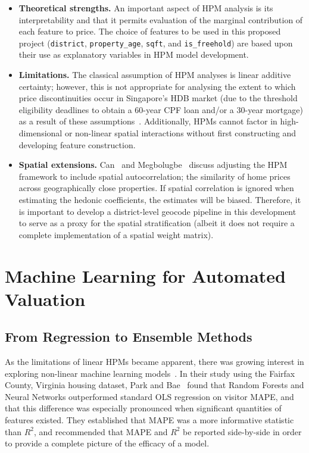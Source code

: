 \begin{itemize}
    \item \textbf{Theoretical strengths.} An important aspect of HPM analysis is its interpretability and that it permits 
    evaluation of the marginal contribution of each feature to price. The choice 
    of features to be used in this proposed project (\texttt{district}, 
    \texttt{property\_age}, \texttt{sqft}, and \texttt{is\_freehold}) are based 
    upon their use as explanatory variables in HPM model development.

    \item \textbf{Limitations.} The classical assumption of HPM analyses is linear additive certainty; however, 
    this is not appropriate for analysing the extent to which price 
    discontinuities occur in Singapore's HDB market (due to the threshold 
    eligibility deadlines to obtain a $60$-year CPF loan and/or a $30$-year 
    mortgage) as a result of these assumptions~\cite{fan2006determinants}. 
    Additionally, HPMs cannot factor in high-dimensional or non-linear spatial 
    interactions without first constructing and developing feature construction.

    \item \textbf{Spatial extensions.} Can~\cite{can1992specification} and Megbolugbe~\cite{can1997spatial} discuss 
    adjusting the HPM framework to include spatial autocorrelation; the similarity 
    of home prices across geographically close properties. If spatial correlation 
    is ignored when estimating the hedonic coefficients, the estimates will be 
    biased. Therefore, it is important to develop a district-level geocode pipeline 
    in this development to serve as a proxy for the spatial stratification (albeit 
    it does not require a complete implementation of a spatial weight matrix).
\end{itemize}

\section{Machine Learning for Automated Valuation}

\subsection{From Regression to Ensemble Methods}

As the limitations of linear HPMs became apparent, there was growing interest in 
exploring non-linear machine learning models~\cite{park2015using}. In their 
study using the Fairfax County, Virginia housing dataset, Park and 
Bae~\cite{park2015using} found that Random Forests and Neural Networks 
outperformed standard OLS regression on visitor MAPE, and that this difference 
was especially pronounced when significant quantities of features existed. They 
established that MAPE was a more informative statistic than $R^2$, and 
recommended that MAPE and $R^2$ be reported side-by-side in order to provide a 
complete picture of the efficacy of a model.

